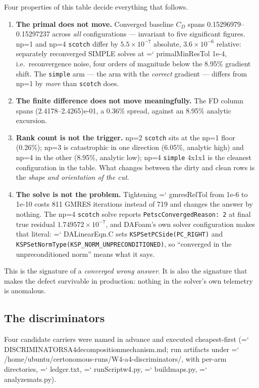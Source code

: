 \documentclass[11pt,a4paper]{article}
\newcommand{\artifact}[1]{{\small\ttfamily\hyphenchar\font=`\-\relax
  \def\_{\textunderscore\allowbreak}#1}}
\begin{document}
Four properties of this table decide everything that follows.

\begin{enumerate}
\item \textbf{The primal does not move.} Converged baseline \(C_D\) spans
0.15296979--0.15297237 across \emph{all} configurations --- invariant to five significant
figures. np=1 and np=4 \texttt{scotch} differ by \(5.5\times10^{-7}\) absolute,
\(3.6\times10^{-6}\) relative: separately reconverged SIMPLE solves at
\artifact{primalMinResTol} 1e-4, i.e.\ reconvergence noise, four orders of magnitude below
the 8.95\% gradient shift. The \texttt{simple} arm --- the arm with the \emph{correct}
gradient --- differs from np=1 by \emph{more} than \texttt{scotch} does.
\item \textbf{The finite difference does not move meaningfully.} The FD column spans
(2.4178--2.4265)e-01, a 0.36\% spread, against an 8.95\% analytic excursion.
\item \textbf{Rank count is not the trigger.} np=2 \texttt{scotch} sits at the np=1 floor
(0.26\%); np=3 is catastrophic in one direction (6.05\%, analytic high) and np=4 in the
other (8.95\%, analytic low); np=4 \texttt{simple} 4x1x1 is the cleanest configuration in
the table. What changes between the dirty and clean rows is the \emph{shape and orientation
of the cut}.
\item \textbf{The solve is not the problem.} Tightening \artifact{gmresRelTol} from 1e-6 to
1e-10 costs 811 GMRES iterations instead of 719 and changes the answer by nothing. The
np=4 \texttt{scotch} solve reports \texttt{PetscConvergedReason: 2} at final true residual
\(1.749572\times10^{-7}\), and DAFoam's own solver configuration makes that literal:
\artifact{DALinearEqn.C} sets \texttt{KSPSetPCSide(PC\_RIGHT)} and
\texttt{KSPSetNormType(KSP\_NORM\_UNPRECONDITIONED)}, so ``converged in the unpreconditioned
norm'' means what it says.
\end{enumerate}

This is the signature of a \emph{converged wrong answer}. It is also the signature that
makes the defect survivable in production: nothing in the solver's own telemetry is
anomalous.

\subsection{The discriminators}

Four candidate carriers were named in advance and executed cheapest-first
(\artifact{DISCRIMINATORS\_A4\_decomposition\_mechanism.md}; run artifacts under
\artifact{/home/ubuntu/certonomous-runs/W4-a4-discriminators/}, with per-arm directories,
\artifact{ledger.txt}, \artifact{runScript\_w4.py}, \artifact{build\_maps.py},
\artifact{analyze\_mats.py}).
\end{document}
